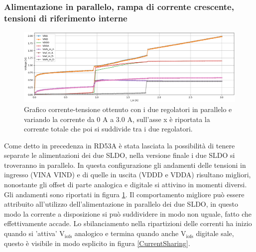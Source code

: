% 
%

\subsubsection{Alimentazione in parallelo, rampa di corrente crescente, tensioni di riferimento interne} 
\begin{figure}[h]
\centering
\includegraphics[width=\textwidth]{Immagini/PUI}
\caption{Grafico corrente-tensione ottenuto con i due regolatori in parallelo e variando la corrente da 0 A a 3.0 A, sull'asse x è riportata la corrente totale che poi si suddivide tra i due regolatori.}
\label{PUI}
\end{figure}
Come detto in precedenza in RD53A è stata lasciata la possibilità di tenere separate le alimentazioni dei due SLDO, nella versione finale i due SLDO si troveranno in parallelo. 
In questa configurazione gli andamenti delle tensioni in ingresso (VINA VIND) e di quelle in uscita (VDDD e VDDA) risultano migliori, nonostante gli offset di parte analogica e digitale si attivino in momenti diversi. 
Gli andamenti sono riportati in figura \ref{PUI}. Il comportamento migliore può essere attribuito all'utilizzo dell'alimentazione in parallelo dei due SLDO, in questo modo la corrente a disposizione si può suddividere in modo non uguale, fatto che effettivamente accade. 
Lo sbilanciamento nella ripartizioni delle correnti ha inizio quando si 'attiva' $\mathrm{V_{iofs}}$ analogico e termina quando anche $\mathrm{V_{iofs}}$  digitale sale, questo è visibile in modo esplicito in figura \ref{CurrentSharing}.
